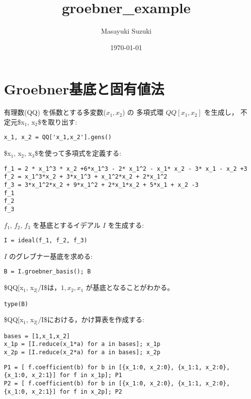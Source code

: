 \documentclass[a4j]{jarticle}
\author{Masayuki Suzuki}
\date{\today}
\title{groebner\_example}
\begin{document}
\maketitle
\tableofcontents

\section{Groebner基底と固有値法}
\label{sec-1}

有理数(QQ) を係数とする多変数($x_1, x_2$) の
多項式環 $QQ[x_1, x_2]$ を生成し，
不定元\$x$_{\text{1}}$, x$_{\text{2}}$\$を取り出す:

\begin{verbatim}
x_1, x_2 = QQ['x_1,x_2'].gens()
\end{verbatim}


\$x$_{\text{1}}$, x$_{\text{2}}$, x$_{\text{3}}$\$を使って多項式を定義する:
\begin{verbatim}
f_1 = 2 * x_1^3 * x_2 +6*x_1^3 - 2* x_1^2 - x_1* x_2 - 3* x_1 - x_2 +3
f_2 = x_1^3*x_2 + 3*x_1^3 + x_1^2*x_2 + 2*x_1^2
f_3 = 3*x_1^2*x_2 + 9*x_1^2 + 2*x_1*x_2 + 5*x_1 + x_2 -3
f_1
f_2
f_3
\end{verbatim}

$f_1$, $f_2$, $f_3$ を基底とするイデアル $I$ を生成する:
\begin{verbatim}
I = ideal(f_1, f_2, f_3)
\end{verbatim}

$I$ のグレブナー基底を求める:

\begin{verbatim}
B = I.groebner_basis(); B
\end{verbatim}

\$QQ[x$_{\text{1}}$, x$_{\text{2]}}$/I\$は，$1, x_2, x_1$ が基底となることがわかる。

\begin{verbatim}
type(B)
\end{verbatim}

\$QQ[x$_{\text{1}}$, x$_{\text{2]}}$/I\$における，かけ算表を作成する:

\begin{verbatim}
bases = [1,x_1,x_2]
x_1p = [I.reduce(x_1*a) for a in bases]; x_1p
x_2p = [I.reduce(x_2*a) for a in bases]; x_2p
\end{verbatim}

\begin{verbatim}
P1 = [ f.coefficient(b) for b in [{x_1:0, x_2:0}, {x_1:1, x_2:0}, {x_1:0, x_2:1}] for f in x_1p]; P1
P2 = [ f.coefficient(b) for b in [{x_1:0, x_2:0}, {x_1:1, x_2:0}, {x_1:0, x_2:1}] for f in x_2p]; P2
\end{verbatim}
\end{document}
